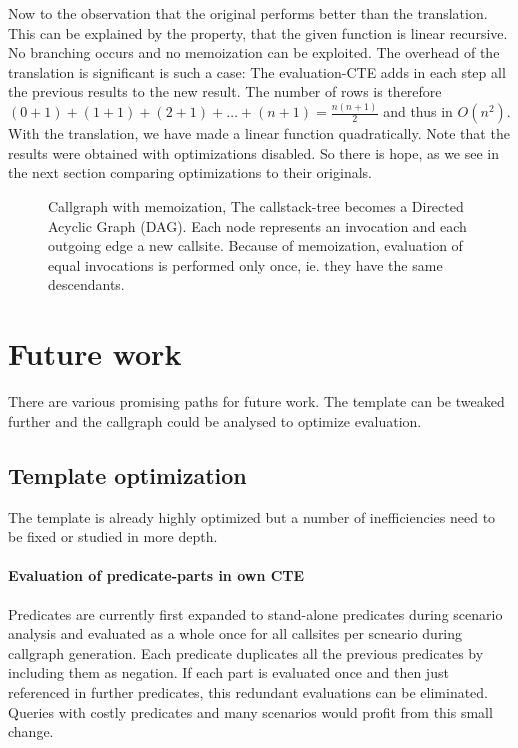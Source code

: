 Now to the observation that the original performs better than the translation. This can be explained by the property, that the given function is linear recursive. No branching occurs and no memoization can be exploited. The overhead of the translation is significant is such a case: The evaluation-CTE adds in each step all the previous results to the new result. The number of rows is therefore $(0 + 1) + (1 + 1) + (2 + 1) + \dots + (n + 1) = \frac{n(n+1)}{2}$ and thus in $O(n^2)$. With the translation, we have made a linear function quadratically. Note that the results were obtained with optimizations disabled. So there is hope, as we see in the next section comparing optimizations to their originals.




\begin{figure}
    \centering
    
    \caption{Callgraph with memoization, The callstack-tree becomes a Directed Acyclic Graph (DAG). Each node represents an invocation and each outgoing edge a new callsite. Because of memoization, evaluation of equal invocations is performed only once, ie. they have the same descendants.}
    \label{fig:fib_callstack_memoization}
\end{figure}



\section{Future work}

There are various promising paths for future work. The template can be tweaked further and the callgraph could be analysed to optimize evaluation.

\subsection{Template optimization}
The template is already highly optimized but a number of inefficiencies need to be fixed or studied in more depth.

\paragraph*{Evaluation of predicate-parts in own CTE}
Predicates are currently first expanded to stand-alone predicates during scenario analysis and evaluated as a whole once for all callsites per scneario during callgraph generation. Each predicate duplicates all the previous predicates by including them as negation. If each part is evaluated once and then just referenced in further predicates, this redundant evaluations can be eliminated. Queries with costly predicates and many scenarios would profit from this small change.


